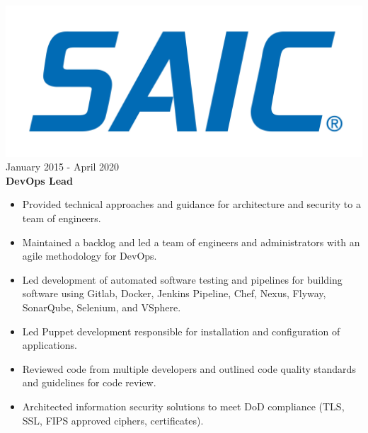 \documentclass[12pt, line, margin]{res}
\begin{document}
\begin{resume}
{\sl  \includegraphics[scale=0.015, trim=110 200 110 120]{resume_images/SAIC_logo_RGB-lg.jpg}} \hfill January 2015 - April 2020 \\
                \textbf{DevOps Lead} 
                 \begin{itemize}  \itemsep -2pt %
	      \item   Provided technical approaches and guidance for architecture \newline
                                and security to a team of engineers.
                 \item   Maintained a backlog and led a team of engineers and \newline
                             administrators with an agile methodology for DevOps.
	      \item   Led development of automated software testing and pipelines \newline
                               for building software using Gitlab, Docker, Jenkins Pipeline, Chef, 
                               Nexus, Flyway, SonarQube, Selenium, and VSphere.
                 \item  Led Puppet development responsible for installation and \newline
                               configuration of applications.
               \item  Reviewed code from multiple developers and outlined code quality \newline
                               standards and guidelines for code review.
	      \item   Architected information security solutions to meet DoD \newline
                              compliance (TLS, SSL, FIPS approved ciphers, certificates).
                \end{itemize}
                

\end{resume}
\end{document}
